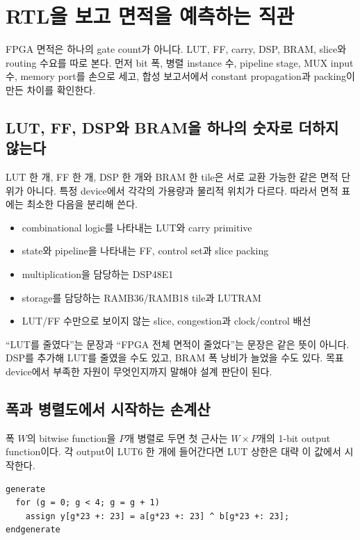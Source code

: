 \chapter{RTL을 보고 면적을 예측하는 직관}

\begin{summarybox}[면적을 읽는 핵심]
FPGA 면적은 하나의 gate count가 아니다. LUT, FF, carry, DSP, BRAM, slice와 routing
수요를 따로 본다. 먼저 bit 폭, 병렬 instance 수, pipeline stage, MUX input 수,
memory port를 손으로 세고, 합성 보고서에서 constant propagation과 packing이 만든
차이를 확인한다.
\end{summarybox}

\section{LUT, FF, DSP와 BRAM을 하나의 숫자로 더하지 않는다}

LUT 한 개, FF 한 개, DSP 한 개와 BRAM 한 tile은 서로 교환 가능한 같은 면적
단위가 아니다. 특정 device에서 각각의 가용량과 물리적 위치가 다르다. 따라서
면적 표에는 최소한 다음을 분리해 쓴다.

\begin{itemize}
  \item combinational logic를 나타내는 LUT와 carry primitive
  \item state와 pipeline을 나타내는 FF, control set과 slice packing
  \item multiplication을 담당하는 DSP48E1
  \item storage를 담당하는 RAMB36/RAMB18 tile과 LUTRAM
  \item LUT/FF 수만으로 보이지 않는 slice, congestion과 clock/control 배선
\end{itemize}

``LUT를 줄였다''는 문장과 ``FPGA 전체 면적이 줄었다''는 문장은 같은 뜻이 아니다.
DSP를 추가해 LUT를 줄였을 수도 있고, BRAM 폭 낭비가 늘었을 수도 있다. 목표
device에서 부족한 자원이 무엇인지까지 말해야 설계 판단이 된다.

\section{폭과 병렬도에서 시작하는 손계산}

폭 $W$의 bitwise function을 $P$개 병렬로 두면 첫 근사는 $W\times P$개의
1-bit output function이다. 각 output이 LUT6 한 개에 들어간다면 LUT 상한은
대략 이 값에서 시작한다.

\begin{lstlisting}
generate
  for (g = 0; g < 4; g = g + 1)
    assign y[g*23 +: 23] = a[g*23 +: 23] ^ b[g*23 +: 23];
endgenerate
\end{lstlisting}

